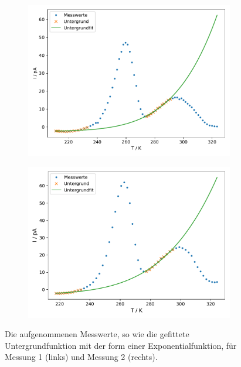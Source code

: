 \begin{figure}
    \centering
    \begin{subfigure}[b]{0.49\textwidth}
        \centering
        \includegraphics[width= \textwidth]{plots/mitunter_1.5grad.pdf}
    \end{subfigure}
    \hfill
    \begin{subfigure}[b]{0.49\textwidth}
        \centering
        \includegraphics[width= \textwidth]{plots/mitunter_2grad.pdf}
    \end{subfigure}
    \caption{Die aufgenommenen Messwerte, so wie die gefittete Untergrundfunktion mit der form einer Exponentialfunktion, für Messung 1 (links) und Messung 2 (rechts).}
    \label{fig:1}
\end{figure}


